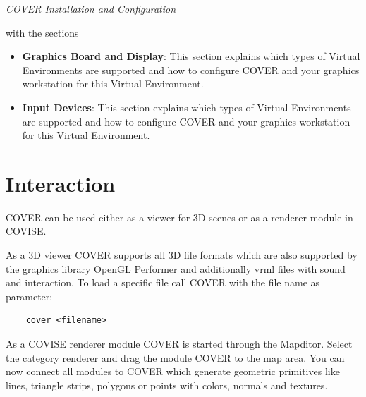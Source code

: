  {\it COVER Installation and Configuration}\newline

with the sections

\begin{itemize}
\item {\bf Graphics Board and Display}: 
This section explains which types of Virtual Environments are supported and how to configure COVER and your graphics workstation for this Virtual Environment.
\item {\bf Input Devices}: This section explains which types of Virtual Environments are supported and how
to configure COVER and your graphics workstation for this Virtual Environment.
\end{itemize}



% 
%


\section{Interaction}
\label{label_chapter_interaction}

COVER can be used either as a viewer for 3D scenes or as a renderer
module in COVISE.

As a 3D viewer COVER supports all 3D file formats which are also supported by the 
graphics library OpenGL Performer and additionally vrml files with 
sound and interaction. To load a specific file call COVER with the file 
name as parameter:
\begin{samepage}
\begin{verbatim}
    cover <filename>
\end{verbatim}
\end{samepage}


As a COVISE renderer module COVER is started through the Mapditor. Select the category renderer
and drag the module COVER to the map area. You can now connect all modules
to COVER which generate geometric primitives like lines, triangle strips, 
polygons or points with colors, normals and textures.

